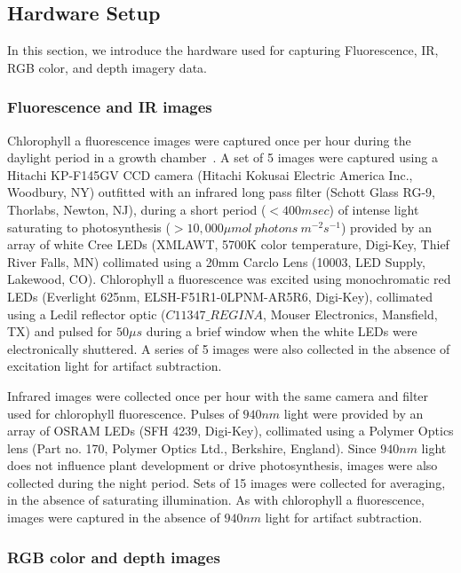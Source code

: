 \subsection{Hardware Setup}

In this section, we introduce the hardware used for capturing Fluorescence, IR, RGB color, and depth imagery data.

\subsubsection{Fluorescence and IR images}
Chlorophyll a fluorescence images were captured once per hour during the daylight period in a growth chamber~\cite{cruz2015depi}. A set of 5 images were captured using a Hitachi KP-F145GV CCD camera (Hitachi Kokusai Electric America Inc., Woodbury, NY) outfitted with an infrared long pass filter (Schott Glass RG-9, Thorlabs, Newton, NJ), during a short period ($<400 msec$) of intense light saturating to photosynthesis ($>10,000 \mu mol~photons~m^{-2} s^{-1}$) provided by an array of white Cree LEDs (XMLAWT, 5700K color temperature, Digi-Key, Thief River Falls, MN) collimated using a 20mm Carclo Lens (10003, LED Supply, Lakewood, CO).
%
Chlorophyll a fluorescence was excited using monochromatic red LEDs (Everlight 625nm, ELSH-F51R1-0LPNM-AR5R6, Digi-Key), collimated using a Ledil reflector optic ($C11347\_REGINA$, Mouser Electronics, Mansfield, TX) and pulsed for $50 \mu s$ during a brief window when the white LEDs were electronically shuttered.  A series of 5 images were also collected in the absence of excitation light for artifact subtraction.

Infrared images were collected once per hour with the same camera and filter used for chlorophyll fluorescence.  Pulses of $940 nm$ light were provided by an array of OSRAM LEDs (SFH 4239, Digi-Key), collimated using a Polymer Optics lens (Part no. 170, Polymer Optics Ltd., Berkshire, England).  Since $940 nm$ light does not influence plant development or drive photosynthesis, images were also collected during the night period.  Sets of 15 images were collected for averaging, in the absence of saturating illumination.   As with chlorophyll a fluorescence, images were captured in the absence of $940 nm$ light for artifact subtraction.

\subsubsection{RGB color and depth images} %

